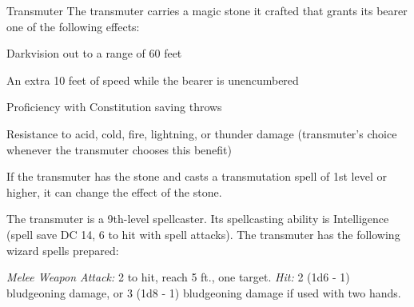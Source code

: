 \documentclass[10pt,a4paper,twoside,bg=print,twocolumn,openany,nodeprecatedcode]{dndbook}
\begin{document}
\begin{DndMonster}[float=t]{Transmuter}
\DndMonsterBasics[
armor-class = {12 (15 with \textit{mage armor})},
hit-points = {\DndDice{9d8}},
speed = {30 ft.}
]
\DndMonsterAbilityScores[
 str = 9,
 dex = 14,
 con = 11,
 int = 17,
 wis = 12,
 cha = 11
]
\DndMonsterDetails[
saving-throws = {Int +6, Wis +4},
skills = {Arcana +6, History +6},
languages = {any four languages},
challenge = 5,
]
The transmuter carries a magic stone it crafted that grants its bearer one of the following effects:

Darkvision out to a range of 60 feet

An extra 10 feet of speed while the bearer is unencumbered

Proficiency with Constitution saving throws

Resistance to acid, cold, fire, lightning, or thunder damage (transmuter's choice whenever the transmuter chooses this benefit)

If the transmuter has the stone and casts a transmutation spell of 1st level or higher, it can change the effect of the stone.

The transmuter is a 9th-level spellcaster. Its spellcasting ability is Intelligence (spell save DC 14, 6 to hit with spell attacks). The transmuter has the following wizard spells prepared:
\begin{DndMonsterSpells}
\end{DndMonsterSpells}
\textsl{Melee Weapon Attack:} 2 to hit, reach 5 ft., one target. \textsl{Hit:} 2 (1d6 - 1) bludgeoning damage, or 3 (1d8 - 1) bludgeoning damage if used with two hands.

\end{DndMonster}
\end{document}
